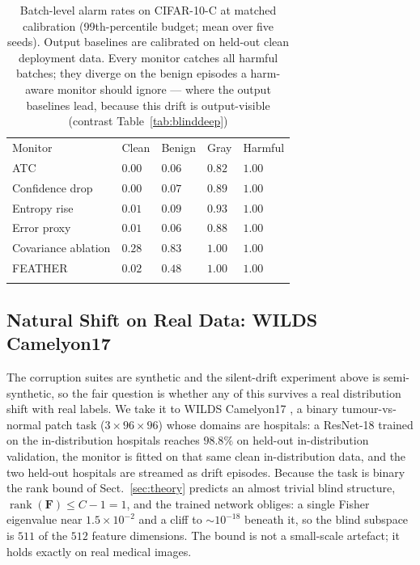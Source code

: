 \documentclass[acmsmall,screen]{acmart}
\providecommand{\svhline}{\hline}                        %
\theoremstyle{acmdefinition}
\begin{document}
\begin{table}[!t]
\caption{Batch-level alarm rates on CIFAR-10-C at matched calibration
(99th-percentile budget; mean over five seeds). Output baselines are
calibrated on held-out clean deployment data. Every monitor catches all
harmful batches; they diverge on the benign episodes a harm-aware
monitor should ignore --- where the output baselines lead, because this
drift is output-visible (contrast Table~\ref{tab:blinddeep})}
\label{tab:alarms}
\begin{tabular}{p{3.3cm}p{1.7cm}p{1.7cm}p{1.7cm}p{1.7cm}}
\hline\noalign{\smallskip}
Monitor & Clean & Benign & Gray & Harmful \\
\noalign{\smallskip}\svhline\noalign{\smallskip}
ATC \cite{garg2022atc} & $0.00$ & $\mathbf{0.06}$ & $0.82$ & $1.00$ \\
Confidence drop & $0.00$ & $0.07$ & $0.89$ & $1.00$ \\
Entropy rise & $0.01$ & $0.09$ & $0.93$ & $1.00$ \\
Error proxy \cite{amoukou2024sequential} & $0.01$ & $\mathbf{0.06}$ & $0.88$ & $1.00$ \\
\noalign{\smallskip}
Covariance ablation & $0.28$ & $0.83$ & $1.00$ & $1.00$ \\
FEATHER & $0.02$ & $0.48$ & $1.00$ & $1.00$ \\
\noalign{\smallskip}\hline\noalign{\smallskip}
\end{tabular}
\end{table}

\subsection{Natural Shift on Real Data: WILDS Camelyon17}
\label{sec:wilds}

The corruption suites are synthetic and the silent-drift experiment above is
semi-synthetic, so the fair question is whether any of this survives a real
distribution shift with real labels. We take it to WILDS Camelyon17
\cite{koh2021wilds}, a binary tumour-vs-normal patch task
($3\times96\times96$) whose domains are hospitals: a ResNet-18 trained on the
in-distribution hospitals reaches $98.8\%$ on held-out in-distribution
validation, the monitor is fitted on that same clean in-distribution data, and
the two held-out hospitals are streamed as drift episodes. Because the task is
binary the rank bound of Sect.~\ref{sec:theory} predicts an almost trivial
blind structure, $\operatorname{rank}(\mathbf{F}) \le C-1 = 1$, and the trained
network obliges: a single Fisher eigenvalue near $1.5\times10^{-2}$ and a cliff
to $\sim10^{-18}$ beneath it, so the blind subspace is $511$ of the $512$
feature dimensions. The bound is not a small-scale artefact; it holds exactly
on real medical images.
\end{document}
